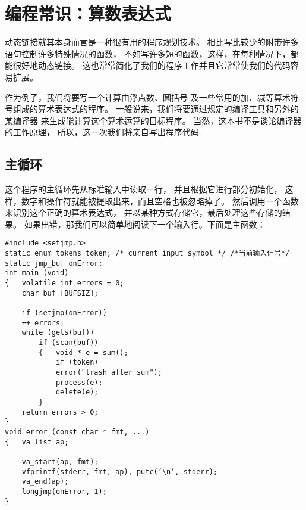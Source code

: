 

\chapter{编程常识：算数表达式}
\label{ch:psArithmeticExpressions}

动态链接就其本身而言是一种很有用的程序规划技术。
相比写比较少的附带许多  语句控制许多特殊情况的函数，
不如写许多短的函数，这样，在每种情况下，都能很好地动态链接。
这也常常简化了我们的程序工作并且它常常使我们的代码容易扩展。


作为例子，我们将要写一个计算由浮点数、圆括号
及一些常用的加、减等算术符号组成的算术表达式的程序。
一般说来，我们将要通过规定的编译工具和另外的某编译器
来生成能计算这个算术运算的目标程序。
当然，这本书不是谈论编译器的工作原理，
所以，这一次我们将亲自写出程序代码.

\section{主循环}
\label{sec:mainloop}

这个程序的主循环先从标准输入中读取一行，
并且根据它进行部分初始化，
这样，数字和操作符就能被提取出来，而且空格也被忽略掉了。
然后调用一个函数来识别这个正确的算术表达式，
并以某种方式存储它，最后处理这些存储的结果。
如果出错，那我们可以简单地阅读下一个输入行。下面是主函数：
\begin{lstlisting}
#include <setjmp.h>
static enum tokens token; /* current input symbol */ /*当前输入信号*/
static jmp_buf onError;
int main (void)
{   volatile int errors = 0;
    char buf [BUFSIZ];

    if (setjmp(onError))
    ++ errors;
    while (gets(buf))
        if (scan(buf))
        {   void * e = sum();
            if (token)
            error("trash after sum");
            process(e);
            delete(e);
        }
    return errors > 0;
}
void error (const char * fmt, ...)
{   va_list ap;

    va_start(ap, fmt);
    vfprintf(stderr, fmt, ap), putc(’\n’, stderr);
    va_end(ap);
    longjmp(onError, 1);
}
\end{lstlisting}

